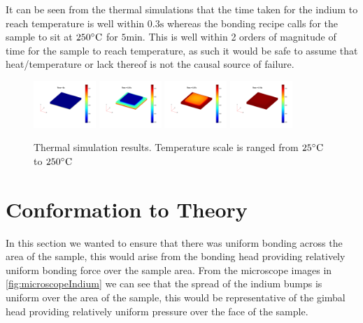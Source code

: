 It can be seen from the thermal simulations that the time taken for the indium to reach temperature is well within $0.3 \unit{\second}$ whereas the bonding recipe calls for the sample to sit at $250 \dC$ for $5 \unit{\minute}$. This is well within 2 orders of magnitude of time for the sample to reach temperature, as such it would be safe to assume that heat/temperature or lack thereof is not the causal source of failure.


\begin{figure}
    \centering
    \includegraphics[width=0.21\textwidth]{Main/Ch2/heat/001.png}
    \includegraphics[width=0.21\textwidth]{Main/Ch2/heat/002.png}
    \includegraphics[width=0.21\textwidth]{Main/Ch2/heat/008.png}
    \includegraphics[width=0.21\textwidth]{Main/Ch2/heat/020.png}
    \caption{Thermal simulation results. Temperature scale is ranged from $25 \dC$ to $250 \dC$}
    \label{fig:thermal_simulations}
\end{figure}


\section{Conformation to Theory}
In this section we wanted to ensure that there was uniform bonding across the area of the sample, this would arise from the bonding head providing relatively uniform bonding force over the sample area. From the microscope images in \ref{fig:microscopeIndium} we can see that the spread of the indium bumps is uniform over the area of the sample, this would be representative of the gimbal head providing relatively uniform pressure over the face of the sample.

